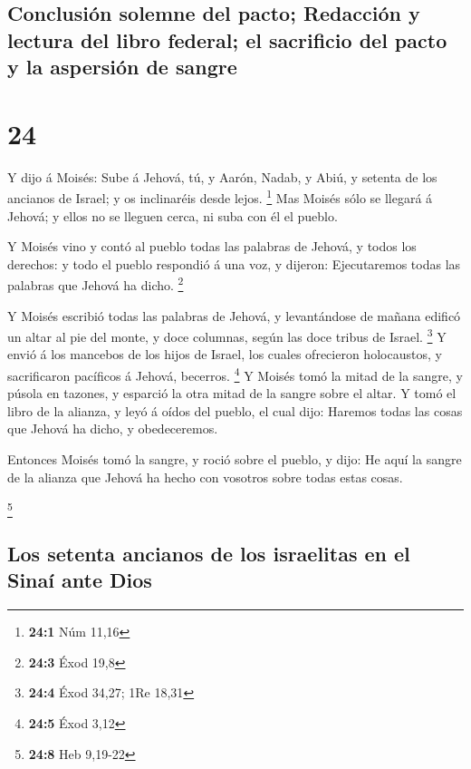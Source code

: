 \hypertarget{conclusiuxf3n-solemne-del-pacto-redacciuxf3n-y-lectura-del-libro-federal-el-sacrificio-del-pacto-y-la-aspersiuxf3n-de-sangre}{%
\subsection{Conclusión solemne del pacto; Redacción y lectura del libro
federal; el sacrificio del pacto y la aspersión de
sangre}\label{conclusiuxf3n-solemne-del-pacto-redacciuxf3n-y-lectura-del-libro-federal-el-sacrificio-del-pacto-y-la-aspersiuxf3n-de-sangre}}

\hypertarget{section-23}{%
\section{24}\label{section-23}}

 Y dijo á Moisés: Sube á Jehová, tú, y Aarón, Nadab, y
Abiú, y setenta de los ancianos de Israel; y os inclinaréis desde lejos.
\footnote{\textbf{24:1} Núm 11,16}  Mas Moisés sólo se
llegará á Jehová; y ellos no se lleguen cerca, ni suba con él el pueblo.

 Y Moisés vino y contó al pueblo todas las palabras de
Jehová, y todos los derechos: y todo el pueblo respondió á una voz, y
dijeron: Ejecutaremos todas las palabras que Jehová ha dicho.
\footnote{\textbf{24:3} Éxod 19,8}

 Y Moisés escribió todas las palabras de Jehová, y
levantándose de mañana edificó un altar al pie del monte, y doce
columnas, según las doce tribus de Israel. \footnote{\textbf{24:4} Éxod
  34,27; 1Re 18,31}  Y envió á los mancebos de los hijos
de Israel, los cuales ofrecieron holocaustos, y sacrificaron pacíficos á
Jehová, becerros. \footnote{\textbf{24:5} Éxod 3,12}  Y
Moisés tomó la mitad de la sangre, y púsola en tazones, y esparció la
otra mitad de la sangre sobre el altar.  Y tomó el libro
de la alianza, y leyó á oídos del pueblo, el cual dijo: Haremos todas
las cosas que Jehová ha dicho, y obedeceremos.

 Entonces Moisés tomó la sangre, y roció sobre el pueblo,
y dijo: He aquí la sangre de la alianza que Jehová ha hecho con vosotros
sobre todas estas cosas.

\footnote{\textbf{24:8} Heb 9,19-22}

\hypertarget{los-setenta-ancianos-de-los-israelitas-en-el-sinauxed-ante-dios}{%
\subsection{Los setenta ancianos de los israelitas en el Sinaí ante
Dios}\label{los-setenta-ancianos-de-los-israelitas-en-el-sinauxed-ante-dios}}

